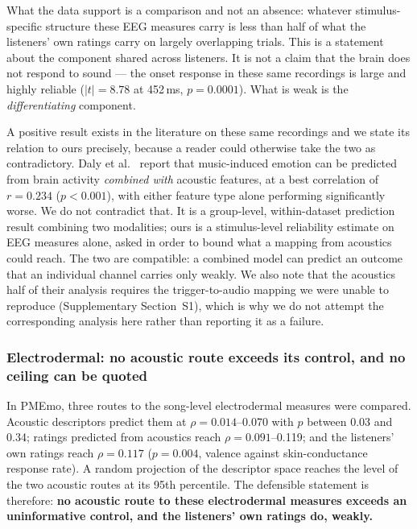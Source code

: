What the data support is a comparison and not an absence: whatever
stimulus-specific structure these EEG measures carry is less than half of what
the listeners' own ratings carry on largely overlapping trials. This is a
statement about the component shared across listeners. It is not a claim that
the brain does not respond to sound --- the onset response in these same
recordings is large and highly reliable ($|t| = 8.78$ at 452\,ms,
$p = 0.0001$). What is weak is the \emph{differentiating} component.

A positive result exists in the literature on these same recordings and we
state its relation to ours precisely, because a reader could otherwise take
the two as contradictory. Daly et al.\ \cite{daly2015} report that
music-induced emotion can be predicted from brain activity \emph{combined
with} acoustic features, at a best correlation of $r = 0.234$
($p < 0.001$), with either feature type alone performing significantly worse.
We do not contradict that. It is a group-level, within-dataset prediction
result combining two modalities; ours is a stimulus-level reliability estimate
on EEG measures alone, asked in order to bound what a mapping from acoustics
could reach. The two are compatible: a combined model can predict an outcome
that an individual channel carries only weakly. We also note that the
acoustics half of their analysis requires the trigger-to-audio mapping we were
unable to reproduce (Supplementary Section~S1), which is why we do not attempt
the corresponding analysis here rather than reporting it as a failure.

\subsubsection{Electrodermal: no acoustic route exceeds its control, and no
ceiling can be quoted}

In PMEmo, three routes to the song-level electrodermal measures were compared.
Acoustic descriptors predict them at $\rho = 0.014$--0.070 with $p$ between
0.03 and 0.34; ratings predicted from acoustics reach $\rho = 0.091$--0.119;
and the listeners' own ratings reach $\rho = 0.117$ ($p = 0.004$, valence
against skin-conductance response rate). A random projection of the descriptor
space reaches the level of the two acoustic routes at its 95th percentile. The
defensible statement is therefore: \textbf{no acoustic route to these
electrodermal measures exceeds an uninformative control, and the listeners'
own ratings do, weakly.}

